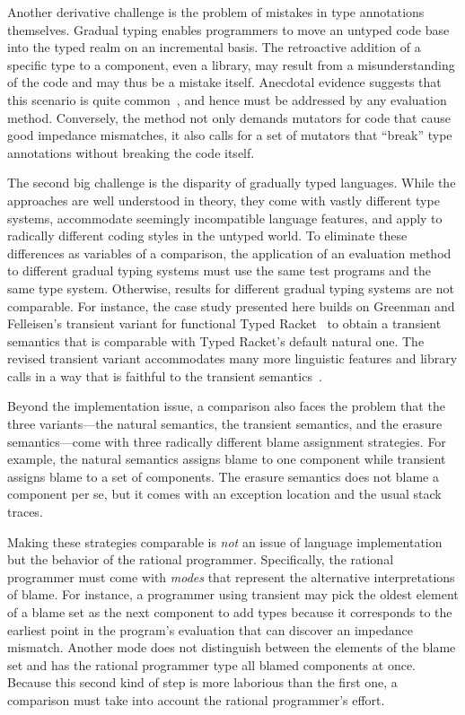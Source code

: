 Another derivative challenge is the problem of mistakes in type
annotations themselves.  Gradual typing enables programmers to move an untyped
code base into the typed realm on an incremental basis. The retroactive addition
of a specific type to a component, even a library, may result from a
misunderstanding of the code and may thus be a mistake itself. Anecdotal 
evidence suggests that this scenario is quite common~\cite{sta-nt-base-types,
incorrect-ts, wmwz-ecoop-2017}, and hence must be addressed by any evaluation
method. Conversely, the method not only demands mutators for code that cause
good impedance mismatches, it also calls for a set of mutators that ``break''
type annotations without breaking the code itself. 

The second big challenge is the disparity of gradually
typed languages. While the approaches are well understood in theory,
they come with vastly different type systems, accommodate seemingly
incompatible language features, and apply to radically different coding
styles in the untyped world.  To eliminate these differences as variables
of a comparison, the application of an evaluation method to different
gradual typing systems must use the same test programs and the same type
system. Otherwise, results for different gradual typing systems are not
comparable.  For instance, the case study presented here builds on
Greenman and Felleisen's transient variant for functional Typed
Racket~\cite{gf-icfp-2018} to obtain a transient semantics that is
comparable with Typed Racket's default natural one. The revised transient
variant accommodates many more linguistic features and library calls
in a way that is faithful to the transient
semantics~\cite{vss-popl-2017}.

Beyond the implementation issue, a comparison also faces the problem that
the three variants---the natural semantics, the transient semantics, and
the erasure semantics---come with three radically different blame
assignment strategies.  For example, the natural semantics assigns blame
to one component while transient assigns blame to a set of components. The
erasure semantics does not blame a component per se, but it comes with an
exception location and the usual stack traces. 

Making these strategies comparable is {\em not\/} an issue of language
implementation but the behavior of the rational programmer.
Specifically, the rational programmer must come with \emph{modes}
that represent the alternative interpretations of blame. 
For instance, a programmer using transient may
pick the oldest element of a blame set as the next component to add types because
it corresponds to the earliest point in the program's evaluation that can
discover an impedance mismatch.  Another mode does not distinguish between the elements of the
blame set and has the rational programmer type all blamed components
at once. Because this second kind of step 
is more laborious than the first one, a comparison must take 
into account the rational programmer's effort.

